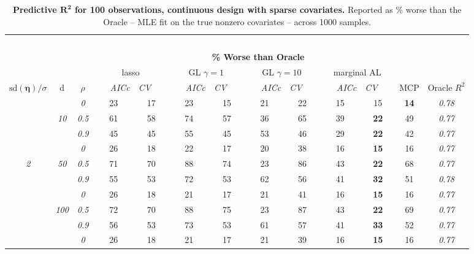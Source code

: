 \begin{table}
\vspace{-.2cm}
\footnotesize
\caption{ 
	{\bf  Predictive $\boldsymbol{R^2}$ for 100 observations, 
	continuous design with sparse covariates.}
  Reported as  \% worse than the Oracle 
  -- MLE fit on the true nonzero covariates -- 
  across 1000 samples.}
\begin{center}
\begin{tabular}{ccc|cc|cc|cc|cc|c|c}
\hline &&&\multicolumn{9}{|c|}{~}\\[-1ex]
\multicolumn{3}{c}{~}&\multicolumn{9}{|c|}{\bf \% Worse than Oracle } &   \\[1ex]
& &
& \multicolumn{2}{c}{lasso} 
& \multicolumn{2}{c}{GL $\gamma=1$} 
& \multicolumn{2}{c}{GL $\gamma=10$} 
& \multicolumn{2}{c}{marginal AL} 
& \multicolumn{1}{c|}{~} & \\[-0.5ex]
$\mathrm{sd}(\boldsymbol{\eta})/\sigma$ & {\sf d} & $\rho$ 
& ~~~\scriptsize\it AICc & \multicolumn{1}{c}{\scriptsize\it CV~~~}
& ~~~\scriptsize\it AICc & \multicolumn{1}{c}{\scriptsize\it CV~~~}
& ~~~\scriptsize\it AICc & \multicolumn{1}{c}{\scriptsize\it CV~~~}
& ~~~\scriptsize\it AICc & \multicolumn{1}{c}{\scriptsize\it CV~~~} 
& \multicolumn{1}{c|}{ MCP} & Oracle $R^2$ \\[.5ex]
\hline\rule{0pt}{3ex}
& & \it  0  & 23 & 17 & 23 & 15 & 21 & 22 & 15 & 15 & {\bf 14} & \it  0.78 \\
 & \it  10  & \it  0.5  & 61 & 58 & 74 & 57 & 36 & 65 & 39 & {\bf 22} & 49 & \it  0.77 \\
& & \it  0.9  & 45 & 45 & 55 & 45 & 53 & 46 & 29 & {\bf 22} & 42 & \it  0.77 \\[1ex]
\cline{2-3}\rule{0pt}{3ex}
& & \it  0  & 26 & 18 & 22 & 17 & 20 & 38 & 16 & {\bf 15} & 16 & \it  0.77 \\
\it  2  & \it  50  & \it  0.5  & 71 & 70 & 88 & 74 & 23 & 86 & 43 & {\bf 22} & 68 & \it  0.77 \\
& & \it  0.9  & 55 & 53 & 72 & 53 & 62 & 56 & 41 & {\bf 32} & 51 & \it  0.78 \\[1ex]
\cline{2-3}\rule{0pt}{3ex}
& & \it  0  & 26 & 18 & 21 & 17 & 21 & 41 & 16 & {\bf 15} & 16 & \it  0.77 \\
 & \it  100  & \it  0.5  & 72 & 70 & 88 & 75 & 23 & 87 & 43 & {\bf 22} & 69 & \it  0.77 \\
& & \it  0.9  & 56 & 53 & 73 & 53 & 61 & 57 & 41 & {\bf 33} & 52 & \it  0.77 \\[1ex]
\cline{2-3}\rule{0pt}{3ex}
& & \it  0  & 26 & 18 & 21 & 17 & 21 & 39 & 16 & {\bf 15} & 16 & \it  0.77 \\

\end{tabular}
\end{center}
\end{table}
